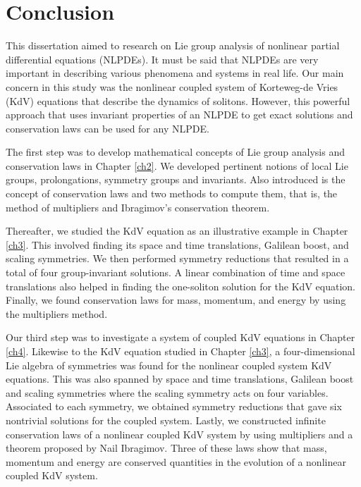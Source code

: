 \chapter{Conclusion \label{ch5}}
This dissertation aimed to research on Lie group analysis of nonlinear partial differential equations (NLPDEs). It must be said that NLPDEs are very important in describing various phenomena and systems in real life. Our main concern in this study was the nonlinear coupled system of Korteweg-de Vries (KdV) equations that describe the dynamics of solitons. However, this powerful approach that uses invariant properties of an NLPDE to get exact solutions and conservation laws can be used for any NLPDE.

The first step was to develop mathematical concepts of Lie group analysis and conservation laws in Chapter \ref{ch2}. We developed pertinent notions of local Lie groups, prolongations, symmetry groups and invariants. Also introduced is the concept of conservation laws and two methods to compute them, that is, the method of multipliers and Ibragimov's conservation theorem.

Thereafter, we studied the KdV equation as an illustrative example in Chapter \ref{ch3}. This involved finding its space and time translations, Galilean boost, and scaling symmetries. We then performed symmetry reductions that resulted in a total of four group-invariant solutions. A linear combination of time and space translations also helped in finding the one-soliton solution for the KdV equation. Finally, we found conservation laws for mass, momentum, and energy by using the multipliers method.


Our third step was to investigate a system of coupled KdV equations in Chapter \ref{ch4}. Likewise to the KdV equation studied in Chapter \ref{ch3}, a four-dimensional Lie algebra of symmetries was found for the nonlinear coupled system KdV equations. This was also spanned by  space and time translations, Galilean boost and scaling symmetries where the scaling symmetry acts on four variables. Associated to each symmetry, we obtained symmetry reductions that gave six nontrivial solutions for the coupled system.  Lastly, we constructed infinite conservation laws of a nonlinear coupled KdV system by using multipliers and a theorem proposed by Nail Ibragimov. Three of these laws show that mass, momentum and energy are conserved quantities in the evolution of a nonlinear coupled KdV system.

